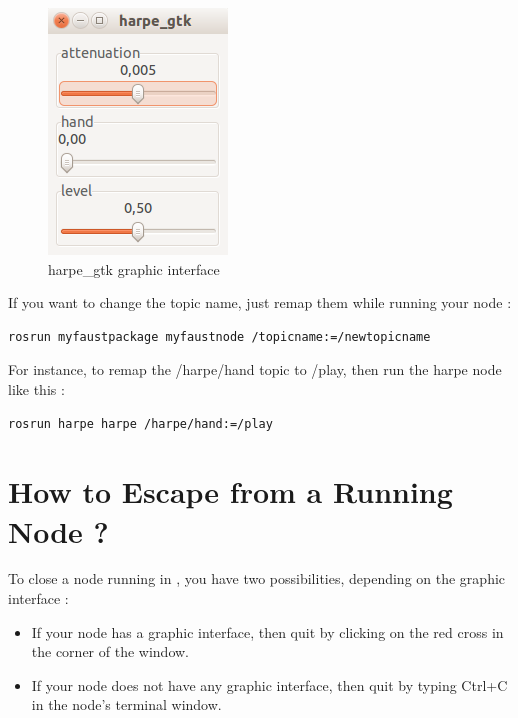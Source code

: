 \begin{figure}[ht!]
\centering
\begin{adjustbox}{minipage=5cm,margin=0pt 10pt,bgcolor=gray}
\centering
\includegraphics[scale=0.5]{images/harpe_gtk.png}
\end{adjustbox}
\caption{harpe\_gtk graphic interface}
\label{fig:harpe_gtk}
\end{figure}

If you want to change the topic name, just remap them while running your node :
\begin{lstlisting}
rosrun myfaustpackage myfaustnode /topicname:=/newtopicname
\end{lstlisting}
For instance, to remap the /harpe/hand topic to /play, then run the harpe node like this :
\begin{lstlisting}
rosrun harpe harpe /harpe/hand:=/play
\end{lstlisting}

\section{How to Escape from a Running Node ?}
To close a node running in \ros, you have two possibilities, depending on the graphic interface :
\begin{itemize}
	\item If your node has a graphic interface, then quit by clicking on the red cross in the corner of the window.
	\item If your node does not have any graphic interface, then quit by typing Ctrl+C in the node's terminal window.
\end{itemize}